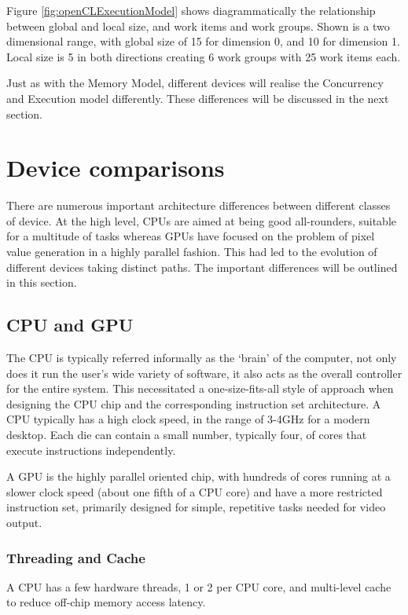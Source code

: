 Figure \ref{fig:openCLExecutionModel} shows diagrammatically the relationship
between global and local size, and work items and work groups. Shown is a two
dimensional range, with global size of 15 for dimension 0, and 10 for dimension
1. Local size is 5 in both directions creating 6 work groups with 25 work items
each.

Just as with the Memory Model, different devices will realise the Concurrency
and Execution model differently. These differences will be discussed in the next
section.

\section{Device comparisons}

There are numerous important architecture differences between different classes
of device. At the high level, CPUs are aimed at being good all-rounders,
suitable for a multitude of tasks whereas GPUs have focused on the problem of
pixel value generation in a highly parallel fashion. This had led to the
evolution of different devices taking distinct paths. The important differences
will be outlined in this section.

\subsection{CPU and GPU}

The CPU is typically referred informally as the `brain' of the computer, not
only does it run the user's wide variety of software, it also acts as the
overall controller for the entire system. This necessitated a one-size-fits-all
style of approach when designing the CPU chip and the corresponding instruction
set architecture. A CPU typically has a high clock speed, in the range of 3-4GHz
for a modern desktop. Each die can contain a small number, typically four, of
cores that execute instructions independently.

A GPU is the highly parallel oriented chip, with hundreds of cores running at a
slower clock speed (about one fifth of a CPU core) and have a more restricted
instruction set, primarily designed for simple, repetitive tasks needed for
video output.

\subsubsection{Threading and Cache}

A CPU has a few hardware threads, 1 or 2 per CPU core, and multi-level cache to
reduce off-chip memory access latency.

